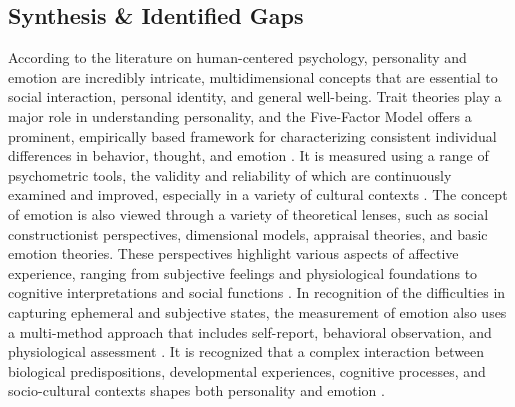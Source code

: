\documentclass{DESSThesis}
\begin{document}
\subsection{Synthesis \& Identified Gaps}
According to the literature on human-centered psychology, personality and emotion are incredibly intricate, multidimensional concepts that are essential to social interaction, personal identity, and general well-being. Trait theories play a major role in understanding personality, and the Five-Factor Model offers a prominent, empirically based framework for characterizing consistent individual differences in behavior, thought, and emotion \cite{feng_five-factor_2024,mccrae_reinterpreting_1989}. It is measured using a range of psychometric tools, the validity and reliability of which are continuously examined and improved, especially in a variety of cultural contexts \cite{johnson_measuring_2014,kajonius_assessing_2019,kamarulzaman_confirmatory_2012}. The concept of emotion is also viewed through a variety of theoretical lenses, such as social constructionist perspectives, dimensional models, appraisal theories, and basic emotion theories. These perspectives highlight various aspects of affective experience, ranging from subjective feelings and physiological foundations to cognitive interpretations and social functions \cite{paul_towards_2020,lerner_emotion_2015,hochschild_emotion_1979}. In recognition of the difficulties in capturing ephemeral and subjective states, the measurement of emotion also uses a multi-method approach that includes self-report, behavioral observation, and physiological assessment \cite{david_watson_panas-x_1994,nummenmaa_bodily_2014}. It is recognized that a complex interaction between biological predispositions, developmental experiences, cognitive processes, and socio-cultural contexts shapes both personality and emotion \cite{cobb-clark_stability_2012,mun_science_2022,parkinson_current_2015}.
\end{document}
